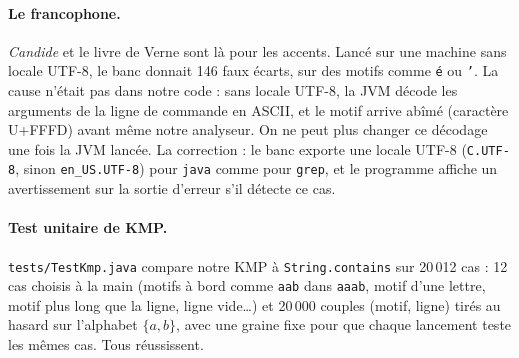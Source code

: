 \paragraph{Le francophone.}
\emph{Candide} et le livre de Verne sont là pour les accents. Lancé sur
une machine sans locale UTF-8, le banc donnait 146 faux écarts, sur des
motifs comme \texttt{é} ou \texttt{’}. La cause n'était pas dans notre code : sans
locale UTF-8, la JVM décode les arguments de la ligne de commande en
ASCII, et le motif arrive abîmé (caractère U+FFFD) avant même notre
analyseur. On ne peut plus changer ce décodage une fois la JVM lancée.
La correction : le banc exporte une locale UTF-8 (\texttt{C.UTF-8}, sinon
\texttt{en\_US.UTF-8}) pour \texttt{java} comme pour \texttt{grep}, et
le programme affiche un avertissement sur la sortie d'erreur s'il
détecte ce cas.

\paragraph{Test unitaire de KMP.}
\texttt{tests/TestKmp.java} compare notre KMP à \texttt{String.contains}
sur 20\,012 cas : 12 cas choisis à la main (motifs à bord comme
\texttt{aab} dans \texttt{aaab}, motif d'une lettre, motif plus long que
la ligne, ligne vide\ldots) et 20\,000 couples (motif, ligne) tirés au
hasard sur l'alphabet $\{a, b\}$, avec une graine fixe pour que chaque
lancement teste les mêmes cas. Tous réussissent.
